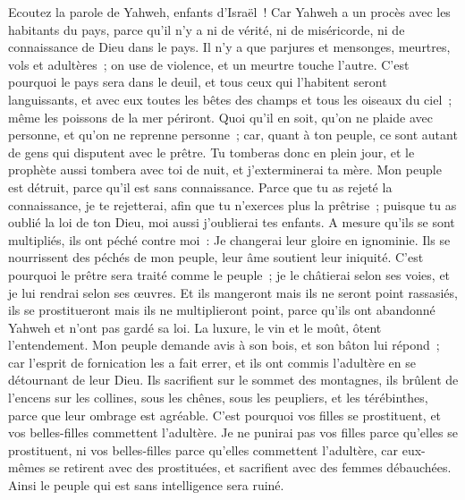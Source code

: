 \begin{multicols}{2}
\VerseOne{}Ecoutez la parole de Yahweh, enfants d'Israël~! Car Yahweh a un procès avec les habitants du pays, parce qu'il n'y a ni de vérité, ni de miséricorde, ni de connaissance de Dieu dans le pays.
Il n'y a que parjures et mensonges, meurtres, vols et adultères~; on use de violence, et un meurtre touche l'autre.
C'est pourquoi le pays sera dans le deuil, et tous ceux qui l'habitent seront languissants, et avec eux toutes les bêtes des champs et tous les oiseaux du ciel~; même les poissons de la mer périront.
Quoi qu'il en soit, qu'on ne plaide avec personne, et qu'on ne reprenne personne~; car, quant à ton peuple, ce sont autant de gens qui disputent avec le prêtre.
Tu tomberas donc en plein jour, et le prophète aussi tombera avec toi de nuit, et j'exterminerai ta mère.
Mon peuple est détruit, parce qu'il est sans connaissance. Parce que tu as rejeté la connaissance, je te rejetterai, afin que tu n'exerces plus la prêtrise~; puisque tu as oublié la loi de ton Dieu, moi aussi j'oublierai tes enfants.
A mesure qu'ils se sont multipliés, ils ont péché contre moi~: Je changerai leur gloire en ignominie.
Ils se nourrissent des péchés de mon peuple, leur âme soutient leur iniquité.
C'est pourquoi le prêtre sera traité comme le peuple~; je le châtierai selon ses voies, et je lui rendrai selon ses œuvres.
Et ils mangeront mais ils ne seront point rassasiés, ils se prostitueront mais ils ne multiplieront point, parce qu'ils ont abandonné Yahweh et n'ont pas gardé sa loi.
La luxure, le vin et le moût, ôtent l'entendement.
Mon peuple demande avis à son bois, et son bâton lui répond~; car l'esprit de fornication les a fait errer, et ils ont commis l'adultère en se détournant de leur Dieu.
Ils sacrifient sur le sommet des montagnes, ils brûlent de l'encens sur les collines, sous les chênes, sous les peupliers, et les térébinthes, parce que leur ombrage est agréable. C'est pourquoi vos filles se prostituent, et vos belles-filles commettent l'adultère.
Je ne punirai pas vos filles parce qu'elles se prostituent, ni vos belles-filles parce qu'elles commettent l'adultère, car eux-mêmes se retirent avec des prostituées, et sacrifient avec des femmes débauchées. Ainsi le peuple qui est sans intelligence sera ruiné.

\end{multicols}
